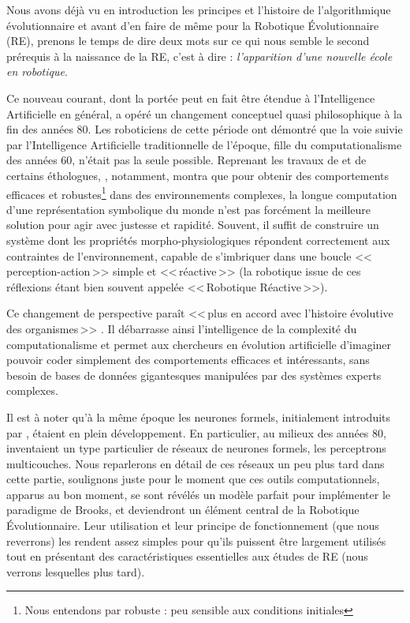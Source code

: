 Nous avons déjà vu en introduction les principes et l'histoire de l'algorithmique évolutionnaire et avant d'en faire de même pour la Robotique \'Evolutionnaire (RE), prenons le temps de dire deux mots sur ce qui nous semble le second prérequis à la naissance de la RE, c'est à dire : \emph{l'apparition d'une nouvelle école en robotique}.

Ce nouveau courant, dont la portée peut en fait être étendue à l'Intelligence Artificielle en général, a opéré un changement conceptuel quasi philosophique à la fin des années 80. Les roboticiens de cette période ont démontré que la voie suivie par l'Intelligence Artificielle traditionnelle de l'époque, fille du computationalisme des années 60, n'était pas la seule possible. Reprenant les travaux de \citet{braintenberg86vehicles} et de certains éthologues, \cite{brooks91intelligencewithoutreason}, notamment, montra que pour obtenir des comportements efficaces et robustes\footnote{Nous entendons par robuste : peu sensible aux conditions initiales} dans des environnements complexes, la longue computation d'une représentation symbolique du monde n'est pas forcément la meilleure solution pour agir avec justesse et rapidité. Souvent, il suffit de construire un système dont les propriétés morpho-physiologiques répondent correctement aux contraintes de l'environnement, capable de s'imbriquer dans une boucle <<\,perception-action\,>> simple et <<\,réactive\,>> (la robotique issue de ces réflexions étant bien souvent appelée <<\,Robotique Réactive\,>>).

Ce changement de perspective paraît <<\,plus en accord avec l'histoire évolutive des organismes\,>> \citep[Brooks dans la préface de ][p. 15]{pfeifer2006howthebodyshapesthewaywethink}. Il débarrasse ainsi l'intelligence de la complexité du computationalisme et permet aux chercheurs en évolution artificielle d'imaginer pouvoir coder simplement des comportements efficaces et intéressants, sans besoin de bases de données gigantesques manipulées par des systèmes experts complexes.

Il est à noter qu'à la même époque les neurones formels, initialement introduits par \cite{mcculloch1943alogicalcideaimmanervacti}, étaient en plein développement. En particulier, au milieux des années 80, \cite{rumelhart1986learninginternalrepresentationsbyerrorpropagation} inventaient un type particulier de réseaux de neurones formels, les perceptrons multicouches. Nous reparlerons en détail de ces réseaux un peu plus tard dans cette partie, soulignons juste pour le moment que ces outils computationnels, apparus au bon moment, se sont révélés un modèle parfait pour implémenter le paradigme de Brooks, et deviendront un élément central de la Robotique \'Evolutionnaire. Leur utilisation et leur principe de fonctionnement (que nous reverrons) les rendent assez simples pour qu'ils puissent être largement utilisés tout en présentant des caractéristiques essentielles aux études de RE (nous verrons lesquelles plus tard).

